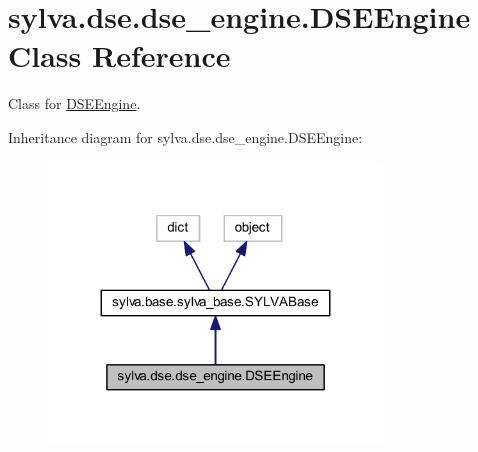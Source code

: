\hypertarget{classsylva_1_1dse_1_1dse__engine_1_1_d_s_e_engine}{}\section{sylva.\+dse.\+dse\+\_\+engine.\+D\+S\+E\+Engine Class Reference}
\label{classsylva_1_1dse_1_1dse__engine_1_1_d_s_e_engine}


Class for \hyperlink{classsylva_1_1dse_1_1dse__engine_1_1_d_s_e_engine}{D\+S\+E\+Engine}.  




Inheritance diagram for sylva.\+dse.\+dse\+\_\+engine.\+D\+S\+E\+Engine\+:\nopagebreak
\begin{figure}[H]
\begin{center}
\leavevmode
\includegraphics[width=251pt]{classsylva_1_1dse_1_1dse__engine_1_1_d_s_e_engine__inherit__graph}
\end{center}
\end{figure}
